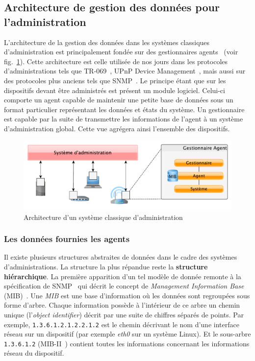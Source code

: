 \subsection{Architecture de gestion des données pour l'administration}
L'architecture de la gestion des données dans les systèmes classiques d'administration est principalement fondée sur des gestionnaires agents~\cite{CCITT:X700} (voir fig.~\ref{fig:rw:supervision:administration}). Cette architecture est celle utilisée de nos jours dans les protocoles d'administrations tels que TR-069~\cite{BBF:tr069}, UPnP Device Management~\cite{UPnP:DM2}, mais aussi sur des protocoles plus anciens tels que SNMP~\cite{IETF:SNMP}. Le principe étant que sur les dispositifs devant être administrés est présent un module logiciel. Celui-ci comporte un agent capable de maintenir une petite base de données sous un format particulier représentant les données et états du système. Un gestionnaire est capable par la suite de transmettre les informations de l'agent à un système d'administration global. Cette vue agrégera ainsi l'ensemble des dispositifs.
\begin{figure}[ht]
    \centering
    \includegraphics[width=.75\textwidth]{fig/rw-supervision-administration}
    \caption{Architecture d'un système classique d'administration}\label{fig:rw:supervision:administration}
\end{figure}

\subsubsection{Les données fournies les agents}
Il existe plusieurs structures abstraites de données dans le cadre des systèmes d'administrations. La structure la plus répandue reste la \textbf{structure hiérarchique}. La première apparition d'un tel modèle de donnée remonte à la spécification de SNMP~\cite{IETF:SNMP} qui décrit le concept de \textit{Management Information Base} (MIB)~\cite{IETF:MIB}. Une \textit{MIB} est une base d'information où les données sont regroupées sous forme d'arbre. Chaque information possède à l'intérieur de ce arbre un chemin unique (l'\textit{object identifier}) décrit par une suite de chiffres séparés de points. Par exemple, \verb|1.3.6.1.2.1.2.2.1.2| est le chemin décrivant le nom d'une interface réseau sur un dispositif (par exemple \textit{eth0} sur un système Linux). Et le sous-arbre \verb|1.3.6.1.2| (MIB-II~\cite{IETF:MIB-II}) contient toutes les informations concernant les informations réseau du dispositif.

